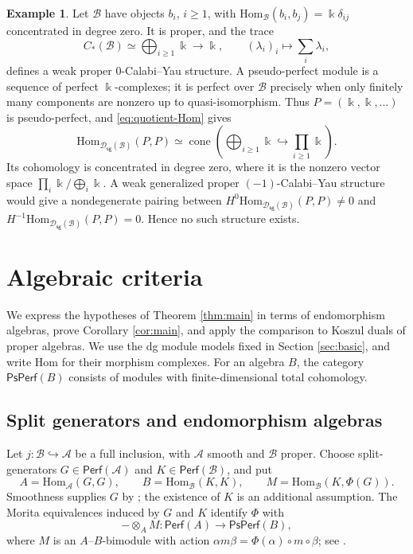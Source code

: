 \documentclass[11pt,letterpaper,reqno]{amsart}
\theoremstyle{plain}
\theoremstyle{definition}
\newtheorem{example}[example]{Example}
\theoremstyle{plain}
\theoremstyle{definition}
\numberwithin{equation}{section}
\begin{document}
\begin{example}\label{ex:singularity-CY-finiteness}
Let $\mathscr B$ have objects $b_i$, $i\geqslant1$, with $\mathrm{Hom}_{\mathscr B}(b_i,b_j)=\Bbbk\delta_{ij}$ concentrated in degree zero.
It is proper, and the trace
\[
C_*(\mathscr B)\simeq\bigoplus_{i\geqslant1}\Bbbk\longrightarrow\Bbbk,
\qquad (\lambda_i)_i\longmapsto\sum_i\lambda_i,
\]
defines a weak proper $0$-Calabi--Yau structure.
A pseudo-perfect module is a sequence of perfect $\Bbbk$-complexes; it is perfect over $\mathscr B$ precisely when only finitely many components are nonzero up to quasi-isomorphism.
Thus $P=(\Bbbk,\Bbbk,\ldots)$ is pseudo-perfect, and \eqref{eq:quotient-Hom} gives
\[
\mathrm{Hom}_{\mathscr D_{\mathsf{sg}}(\mathscr B)}(P,P)
\simeq
\operatorname{cone}\left(\bigoplus_{i\geqslant1}\Bbbk
\hookrightarrow\prod_{i\geqslant1}\Bbbk\right).
\]
Its cohomology is concentrated in degree zero, where it is the nonzero vector space $\prod_i\Bbbk/\bigoplus_i\Bbbk$.
A weak generalized proper $(-1)$-Calabi--Yau structure would give a nondegenerate pairing between $H^{0}\mathrm{Hom}_{\mathscr D_{\mathsf{sg}}(\mathscr B)}(P,P)\neq 0$ and $H^{-1}\mathrm{Hom}_{\mathscr D_{\mathsf{sg}}(\mathscr B)}(P,P)=0$.
Hence no such structure exists.
\end{example}

\section{Algebraic criteria}\label{sec:algebraic-criteria}

We express the hypotheses of Theorem \ref{thm:main} in terms of endomorphism algebras, prove Corollary \ref{cor:main}, and apply the comparison to Koszul duals of proper algebras.
We use the dg module models fixed in Section \ref{sec:basic}, and write $\mathrm{Hom}$ for their morphism complexes.
For an algebra $B$, the category $\mathsf{PsPerf}(B)$ consists of modules with finite-dimensional total cohomology.


\subsection{Split generators and endomorphism algebras}

Let $j:\mathscr{B}\hookrightarrow\mathscr{A}$ be a full inclusion, with $\mathscr{A}$ smooth and $\mathscr{B}$ proper. Choose split-generators $G\in\mathsf{Perf}(\mathscr{A})$ and $K\in\mathsf{Perf}(\mathscr{B})$, and put
\begin{equation}\label{eq:algebraic-models}
A=\mathrm{Hom}_{\mathscr{A}}(G,G), \qquad
B=\mathrm{Hom}_{\mathscr{B}}(K,K),\qquad
M=\mathrm{Hom}_{\mathscr{B}}(K,\Phi(G)).
\end{equation}
Smoothness supplies $G$ by \cite[Lemma 2.5]{Efimov2010}; the existence of $K$ is an additional assumption.
The Morita equivalences induced by $G$ and $K$ identify $\Phi$ with
\[
-\otimes_A M:\mathsf{Perf}(A)\longrightarrow\mathsf{PsPerf}(B),
\]
where $M$ is an $A$--$B$-bimodule with action $\alpha m\beta=\Phi(\alpha)\circ m\circ\beta$; see \cite[Section 3]{Keller2006b}.
\end{document}
